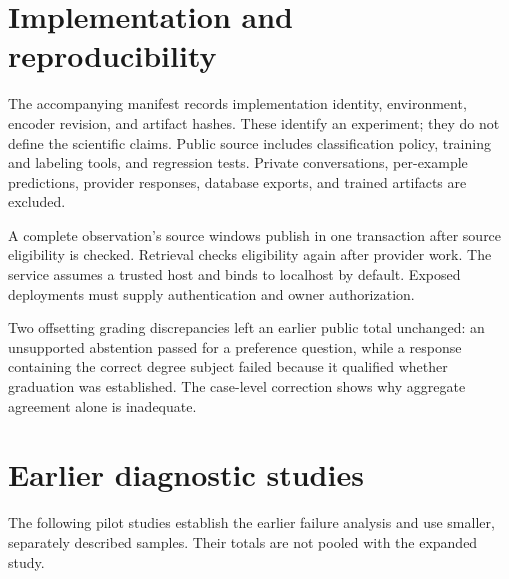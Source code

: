 \documentclass[11pt]{article}
\begin{document}
\clearpage
\appendix
\section{Implementation and reproducibility}
The accompanying manifest records implementation identity, environment, encoder revision, and artifact hashes. These identify an experiment; they do not define the scientific claims. Public source includes classification policy, training and labeling tools, and regression tests. Private conversations, per-example predictions, provider responses, database exports, and trained artifacts are excluded.

A complete observation's source windows publish in one transaction after source eligibility is checked. Retrieval checks eligibility again after provider work. The service assumes a trusted host and binds to localhost by default. Exposed deployments must supply authentication and owner authorization.

Two offsetting grading discrepancies left an earlier public total unchanged: an unsupported abstention passed for a preference question, while a response containing the correct degree subject failed because it qualified whether graduation was established. The case-level correction shows why aggregate agreement alone is inadequate.

\section{Earlier diagnostic studies}
The following pilot studies establish the earlier failure analysis and use smaller, separately described samples. Their totals are not pooled with the expanded study.



\clearpage

\begingroup
\footnotesize
\raggedright
\setlength{\bibsep}{1pt}

\endgroup
\end{document}
